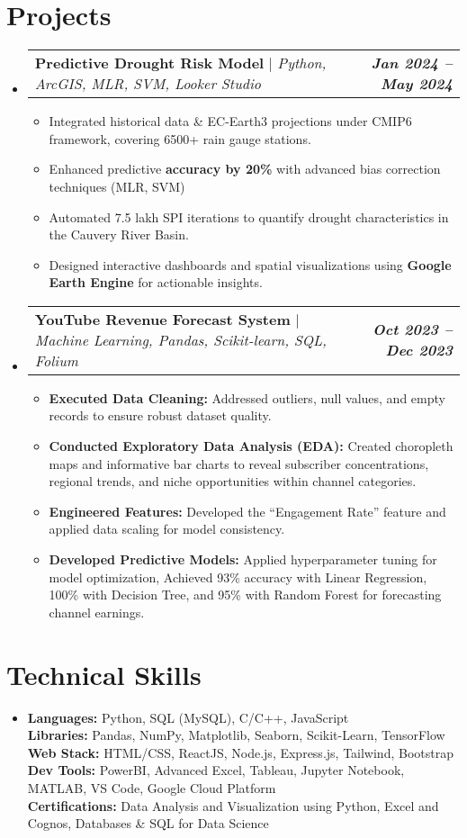 \documentclass[letterpaper,11pt]{article}
\makeatletter
\newcommand{\resumeProjectHeading}[2]{
    \item
    \begin{tabular*}{0.97\textwidth}{l@{\extracolsep{\fill}}r}
      \small#1 & \textit{\textbf{\small#2}} \\
    \end{tabular*}\vspace{-7pt}
}
\newcommand{\resumeItem}[1]{
  \item\small{
    {#1 \vspace{-2pt}}
  }
}
\newcommand{\resumeSubHeadingListStart}{\begin{itemize}[leftmargin=0.15in, label={}]}
\newcommand{\resumeSubHeadingListEnd}{\end{itemize}}
\newcommand{\resumeItemListStart}{\begin{itemize}}
\newcommand{\resumeItemListEnd}{\end{itemize}\vspace{-5pt}}
\makeatother
\begin{document}
\section{Projects}
    \resumeSubHeadingListStart
      \resumeProjectHeading
          {\textbf{Predictive Drought Risk Model} $|$ \emph{Python, ArcGIS, MLR, SVM, Looker Studio}}{Jan 2024 -- May 2024}
          \resumeItemListStart
            \resumeItem{Integrated historical data \& EC-Earth3 projections under CMIP6 framework, covering 6500+ rain gauge stations.}
            \resumeItem{Enhanced predictive \textbf{accuracy by 20\%} with advanced bias correction techniques (MLR, SVM)}
            \resumeItem{Automated 7.5 lakh SPI iterations to quantify drought characteristics in the Cauvery River Basin.}
            \resumeItem{Designed interactive dashboards and spatial visualizations using \textbf{Google Earth Engine} for actionable insights.}
          \resumeItemListEnd
          
      \resumeProjectHeading
          {\textbf{YouTube Revenue Forecast System} $|$ \emph{Machine Learning, Pandas, Scikit-learn, SQL, Folium}}{Oct 2023 -- Dec 2023}
          \resumeItemListStart
            \resumeItem{\textbf{Executed Data Cleaning:} Addressed outliers, null values, and empty records to ensure robust dataset quality.}
            \resumeItem{\textbf{Conducted Exploratory Data Analysis (EDA):} Created choropleth maps and informative bar charts to reveal subscriber concentrations, regional trends, and niche opportunities within channel categories.}
            \resumeItem{\textbf{Engineered Features:} Developed the “Engagement Rate” feature and applied data scaling for model consistency.}
            \resumeItem{\textbf{Developed Predictive Models:} Applied hyperparameter tuning for model optimization, Achieved 93\% accuracy with Linear Regression, 100\% with Decision Tree, and 95\% with Random Forest for forecasting channel earnings.}
          \resumeItemListEnd
    \resumeSubHeadingListEnd


\section{Technical Skills}
 \begin{itemize}[leftmargin=0.15in, label={}]
    \small \item{
         \textbf{Languages:}{ Python, SQL (MySQL), C/C++, JavaScript} \\
         \textbf{Libraries:}{ Pandas, NumPy, Matplotlib, Seaborn, Scikit-Learn, TensorFlow} \\
         \textbf{Web Stack:}{ HTML/CSS, ReactJS, Node.js, Express.js, Tailwind, Bootstrap} \\
         \textbf{Dev Tools:}{ PowerBI, Advanced Excel, Tableau, Jupyter Notebook, MATLAB, VS Code, Google Cloud Platform} \\
         \textbf{Certifications:}{ Data Analysis and Visualization using Python, Excel and Cognos, Databases \& SQL for Data Science}
    } \vspace{-5pt}
 \end{itemize} \vspace{-5pt}
\end{document}
